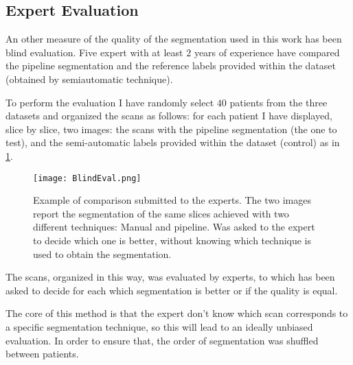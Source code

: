 \documentclass{standalone}
\begin{document}
	\subsection{Expert Evaluation}
	
	An other measure of the quality of the segmentation used in this work has been blind evaluation. Five expert with at least $2$ years of experience have compared the pipeline segmentation and the reference labels provided within the dataset (obtained by semiautomatic technique). 
	
	To perform the evaluation I have randomly select $40$ patients from the three datasets and organized the scans as follows:
	for each patient I have displayed, slice by slice,  two images: the scans with the pipeline segmentation (the one to test), and the semi-automatic labels provided within the dataset (control) as in \figurename\,\ref{fig:Blind}.
	
	\begin{figure}[h!]
		\centering
			\texttt{[image: BlindEval.png]}
			\caption{Example of comparison submitted to the experts. The two images report the segmentation of the same slices achieved with two different techniques: Manual and pipeline. Was asked to the expert to decide which one is better, without knowing which technique is used to obtain the segmentation.}\label{fig:Blind}
	\end{figure}

	The scans, organized in this way, was evaluated by experts, to which has been asked to decide for each which segmentation is better or if the quality is equal.
	
	The core of this method is that the expert don't know which scan corresponds to a specific segmentation technique, so this will lead to an ideally unbiased evaluation.  In order to ensure that, the order of segmentation was shuffled between patients. 
	
	

	
\end{document}
